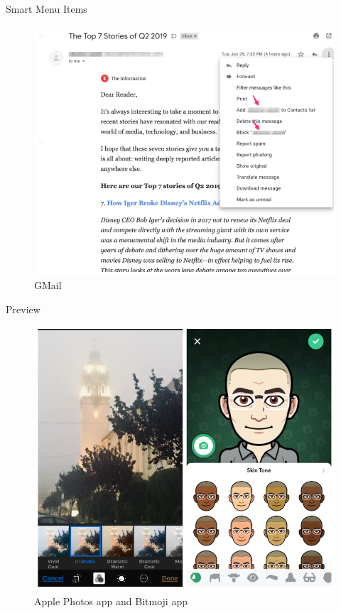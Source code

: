 \documentclass{beamer}
\begin{document}
\begin{frame}[t]{Smart Menu Items}
	\begin{figure}[h]
		\centering
		\includegraphics[scale=0.6]{images/lec08-pic15.png}
		\caption{GMail}
	\end{figure}
\end{frame}

\begin{frame}[t]{Preview}
	\begin{figure}[h]
		\centering
		\includegraphics[scale=0.6]{images/lec08-pic16.png}
		\caption{Apple Photos app and Bitmoji app}
	\end{figure}
\end{frame}
\end{document}
